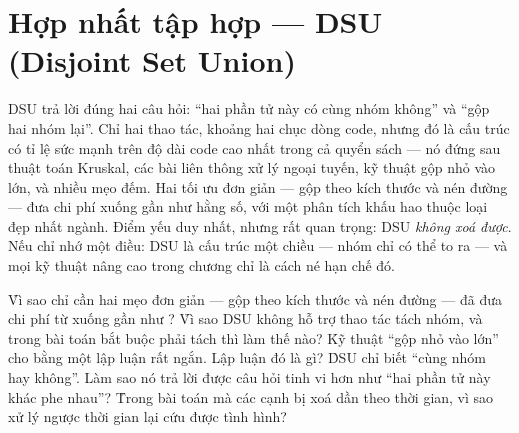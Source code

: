 \documentclass[../../algorithm.tex]{subfiles}
\begin{document}
\chapter{Hợp nhất tập hợp --- DSU (Disjoint Set Union)}

\begin{tomtat}
DSU trả lời đúng hai câu hỏi: ``hai phần tử này có cùng nhóm không'' và ``gộp hai nhóm lại''. Chỉ hai thao tác, khoảng hai chục dòng code, nhưng đó là cấu trúc có tỉ lệ sức mạnh trên độ dài code cao nhất trong cả quyển sách --- nó đứng sau thuật toán Kruskal, các bài liên thông xử lý ngoại tuyến, kỹ thuật gộp nhỏ vào lớn, và nhiều mẹo đếm. Hai tối ưu đơn giản --- gộp theo kích thước và nén đường --- đưa chi phí xuống gần như hằng số, với một phân tích khấu hao thuộc loại đẹp nhất ngành. Điểm yếu duy nhất, nhưng rất quan trọng: DSU \emph{không xoá được}. Nếu chỉ nhớ một điều: DSU là cấu trúc một chiều --- nhóm chỉ có thể to ra --- và mọi kỹ thuật nâng cao trong chương chỉ là cách né hạn chế đó.
\end{tomtat}

\begin{nentang}
\end{nentang}

\begin{khoigoi}
\h{Vì sao chỉ cần hai mẹo đơn giản --- gộp theo kích thước và nén đường --- đã đưa chi phí từ  xuống gần như ?}
\h{Vì sao DSU không hỗ trợ thao tác tách nhóm, và trong bài toán bắt buộc phải tách thì làm thế nào?}
\h{Kỹ thuật ``gộp nhỏ vào lớn'' cho  bằng một lập luận rất ngắn. Lập luận đó là gì?}
\h{DSU chỉ biết ``cùng nhóm hay không''. Làm sao nó trả lời được câu hỏi tinh vi hơn như ``hai phần tử này khác phe nhau''?}
\h{Trong bài toán mà các cạnh bị xoá dần theo thời gian, vì sao xử lý ngược thời gian lại cứu được tình hình?}
\end{khoigoi}
\end{document}
